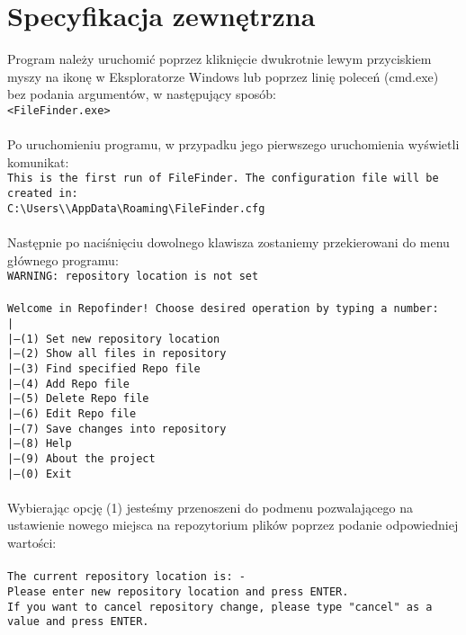 \documentclass[10pt, a4paper]{article}
\begin{document}
\section{Specyfikacja zewnętrzna}
Program należy uruchomić poprzez kliknięcie dwukrotnie lewym przyciskiem myszy na ikonę w Eksploratorze Windows lub poprzez linię poleceń (cmd.exe) bez podania argumentów, w następujący sposób:\\
\texttt{<FileFinder.exe>}\\
\\
Po uruchomieniu programu, w przypadku jego pierwszego uruchomienia wyświetli komunikat:\\
\texttt{This is the first run of FileFinder. The configuration file will be created in:}\\
\texttt{C:\textbackslash Users\textbackslash <nazwa użytkownika>\textbackslash AppData\textbackslash Roaming\textbackslash FileFinder.cfg}\\
\\
Następnie po naciśnięciu dowolnego klawisza zostaniemy przekierowani do menu głównego programu:\\
\texttt{WARNING: repository location is not set\\
\\
Welcome in Repofinder! Choose desired operation by typing a number:\\
|\\
|---(1) Set new repository location\\
|---(2) Show all files in repository\\
|---(3) Find specified Repo file\\
|---(4) Add Repo file\\
|---(5) Delete Repo file\\
|---(6) Edit Repo file\\
|---(7) Save changes into repository\\
|---(8) Help\\
|---(9) About the project\\
|---(0) Exit}\\
\\
Wybierając opcję (1) jesteśmy przenoszeni do podmenu pozwalającego na ustawienie nowego miejsca na repozytorium plików poprzez podanie odpowiedniej wartości:\\
\\
\texttt{The current repository location is: -\\
Please enter new repository location and press ENTER.\\
If you want to cancel repository change, please type "cancel" as a value and press ENTER.}\\
\end{document}
